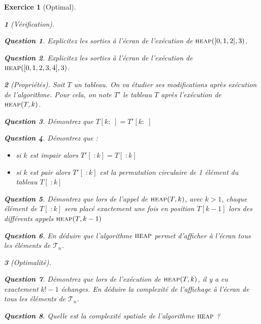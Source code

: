\documentclass{article}
\theoremstyle{exostyle}
\newtheorem{exo}{Exercice}
\theoremstyle{partiestyle}
\newtheorem{partie}{}[exo]
\theoremstyle{questionstyle}
\newtheorem{questionpartie}{Question}[partie]
\begin{document}
\begin{exo}[Optimal]
\begin{partie}[Vérification]
        \begin{questionpartie}
            Explicitez les sorties à l'écran de l'exécution de $\textsc{heap}([0, 1, 2], 3)$.
        \end{questionpartie}
        \begin{questionpartie}
            Explicitez les sorties à l'écran de l'exécution de $\textsc{heap}([0, 1, 2, 3, 4], 3)$.
        \end{questionpartie}
    \end{partie}
    \begin{partie}[Propriétés]
        Soit $T$ un tableau. On va étudier ses modifications après exécution de l'algorithme. Pour cela, on note $T'$ le tableau $T$ après l'exécution de $\textsc{heap}(T, k)$.
            \begin{questionpartie}
                Démontrez que  $T[k:\;] = T'[k:\;]$
            \end{questionpartie}
        \begin{questionpartie}
                Démontrez que :
                \begin{itemize}
                    \item si $k$ est impair alors $T'[\;:k] = T[\;:k]$
                    \item si $k$ est pair alors $T'[\;:k]$ est la permutation circulaire de 1 élément du tableau $T[\;:k]$
            \end{itemize}
        \end{questionpartie}
        \begin{questionpartie}
            Démontrez que lors de l'appel de $\textsc{heap}(T, k)$, avec $k>1$, chaque élément de $T[\;:k]$ sera placé exactement une fois en position $T[k-1]$ lors des différents appels $\textsc{heap}(T, k-1)$
        \end{questionpartie}
        \begin{questionpartie}
            En déduire que l'algorithme $\textsc{heap}$ permet d'afficher à l'écran tous les éléments de $\mathcal{T}_n$.
        \end{questionpartie}
    \end{partie}
    \begin{partie}[Optimalité]
        \begin{questionpartie}
            Démontrez que lors de l'exécution de $\textsc{heap}(T, k)$, il y a eu exactement $k!-1$ échanges. En déduire la complexité de l'affichage à l'écran de tous les éléments de $\mathcal{T}_n$.
        \end{questionpartie}
        \begin{questionpartie}
            Quelle est la complexité spatiale de l'algorithme $\textsc{heap}$ ?
        \end{questionpartie}

    \end{partie}
\end{exo}
\end{document}
